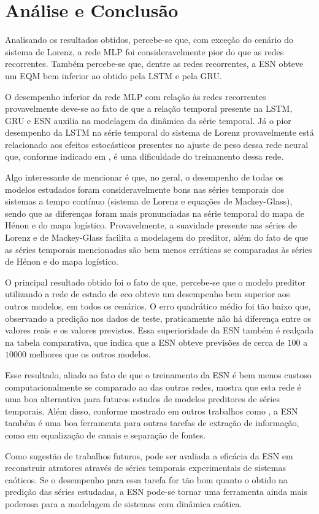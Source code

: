 \documentclass{article}
\begin{document}
\section{Análise e Conclusão}

Analisando os resultados obtidos, percebe-se que, com exceção do cenário do sistema de Lorenz, a rede MLP foi consideravelmente pior do que as redes recorrentes. Também percebe-se que, dentre as redes recorrentes, a ESN obteve um EQM bem inferior ao obtido pela LSTM e pela GRU.

O desempenho inferior da rede MLP com relação às redes recorrentes provavelmente deve-se ao fato de que a relação temporal presente na LSTM, GRU e ESN auxilia na modelagem da dinâmica da série temporal. Já o pior desempenho da LSTM na série temporal do sistema de Lorenz provavelmente está relacionado aos efeitos estocásticos presentes no ajuste de peso dessa rede neural que, conforme indicado em \cite{doya1992bifurcations}, é uma dificuldade do treinamento dessa rede.

Algo interessante de mencionar é que, no geral, o desempenho de todas os modelos estudados foram consideravelmente bons nas séries temporais dos sistemas a tempo contínuo (sistema de Lorenz e equações de Mackey-Glass), sendo que as diferenças foram mais pronunciadas na série temporal do mapa de Hénon e do mapa logístico. Provavelmente, a suavidade presente nas séries de Lorenz e de Mackey-Glass facilita a modelagem do preditor, além do fato de que as séries temporais mencionadas são bem menos erráticas se comparadas às séries de Hénon e do mapa logístico.

O principal resultado obtido foi o fato de que, percebe-se que o modelo preditor utilizando a rede de estado de eco obteve um desempenho bem superior aos outros modelos, em todos os cenários. O erro quadrático médio foi tão baixo que, observando a predição nos dados de teste, praticamente não há diferença entre os valores reais e os valores previstos. Essa superioridade da ESN também é realçada na tabela comparativa, que indica que a ESN obteve previsões de cerca de $100$ a $10000$ melhores que os outros modelos.

Esse resultado, aliado ao fato de que o treinamento da ESN é bem menos custoso computacionalmente se comparado ao das outras redes, mostra que esta rede é uma boa alternativa para futuros estudos de modelos preditores de séries temporais. Além disso, conforme mostrado em outros trabalhos como \cite{jaeger2004harnessing, jaeger2007echo, boccato2013novas}, a ESN também é uma boa ferramenta para outras tarefas de extração de informação, como em equalização de canais e separação de fontes. 

Como sugestão de trabalhos futuros, pode ser avaliada a eficácia da ESN em reconstruir atratores através de séries temporais experimentais de sistemas caóticos. Se o desempenho para essa tarefa for tão bom quanto o obtido na predição das séries estudadas, a ESN pode-se tornar uma ferramenta ainda mais poderosa para a modelagem de sistemas com dinâmica caótica.


{\scriptsize

}
\end{document}
